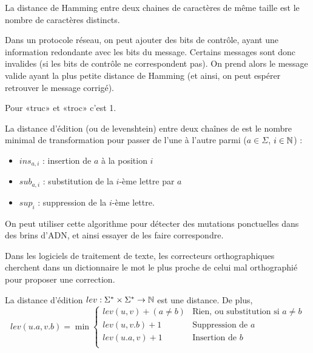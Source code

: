 \begin{definition}
	La distance de Hamming entre deux chaines de caractères de même taille est le nombre de caractères distincts.
\end{definition}

\begin{appl}
	Dans un protocole réseau, on peut ajouter des bits de contrôle, ayant une information redondante avec les bits du message. Certains messages sont donc invalides (si les bits de contrôle ne correspondent pas). On prend alors le message valide ayant la plus petite distance de Hamming (et ainsi, on peut espérer retrouver le message corrigé).
\end{appl}

\begin{example}
	Pour «truc» et «troc» c'est 1.
\end{example}

\begin{definition}
	La distance d'édition (ou de levenshtein) entre deux chaînes de est le nombre minimal de transformation pour passer de l'une à l'autre parmi ($a\in\Sigma$, $i\in \mathbb{N}$) : \begin{itemize}
	\item $ins_{a,i}$ : insertion de $a$ à la position $i$
	\item $sub_{a,i}$ : substitution de la $i$-ème lettre par $a$
	\item $sup_i$ : suppression de la $i$-ème lettre.
	\end{itemize}
\end{definition}

\begin{appl}
	On peut utiliser cette algorithme pour détecter des mutations ponctuelles dans des brins d'ADN, et ainsi essayer de les faire correspondre.
\end{appl}

\begin{appl}
	Dans les logiciels de traitement de texte, les correcteurs orthographiques cherchent dans un dictionnaire le mot le plus proche de celui mal orthographié pour proposer une correction. 
\end{appl}

\begin{proposition}
 	La distance d'édition  $lev : \Sigma^* \times \Sigma^* \to \mathbb{N}$ est une distance. De plus,
	$$lev(u.a, v.b) = \min \left\{ \begin{array}{ll}
		lev(u,v) + (a \neq b) & \text{Rien, ou substitution si $a\neq b$}\\
		lev(u, v.b) + 1 & \text{Suppression de }a \\
		lev(u.a, v) + 1 & \text{Insertion de }b\\
	\end{array}\right.$$
\end{proposition}


